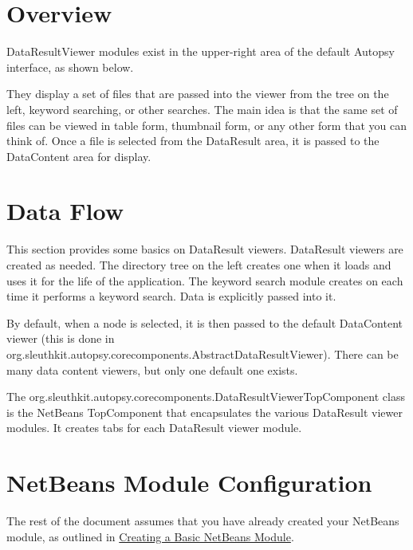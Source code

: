 \hypertarget{mod_result_page_result_overview}{}\section{Overview}\label{mod_result_page_result_overview}
Data\+Result\+Viewer modules exist in the upper-\/right area of the default Autopsy interface, as shown below.



They display a set of files that are passed into the viewer from the tree on the left, keyword searching, or other searches. The main idea is that the same set of files can be viewed in table form, thumbnail form, or any other form that you can think of. Once a file is selected from the Data\+Result area, it is passed to the Data\+Content area for display.\hypertarget{mod_result_page_result_dataflow}{}\section{Data Flow}\label{mod_result_page_result_dataflow}
This section provides some basics on Data\+Result viewers. Data\+Result viewers are created as needed. The directory tree on the left creates one when it loads and uses it for the life of the application. The keyword search module creates on each time it performs a keyword search. Data is explicitly passed into it.

By default, when a node is selected, it is then passed to the default Data\+Content viewer (this is done in org.\+sleuthkit.\+autopsy.\+corecomponents.\+Abstract\+Data\+Result\+Viewer). There can be many data content viewers, but only one default one exists.

The org.\+sleuthkit.\+autopsy.\+corecomponents.\+Data\+Result\+Viewer\+Top\+Component class is the Net\+Beans Top\+Component that encapsulates the various Data\+Result viewer modules. It creates tabs for each Data\+Result viewer module.\hypertarget{mod_result_page_result_nb}{}\section{Net\+Beans Module Configuration}\label{mod_result_page_result_nb}
The rest of the document assumes that you have already created your Net\+Beans module, as outlined in \hyperlink{mod_dev_page_mod_dev_module}{Creating a Basic Net\+Beans Module}.

